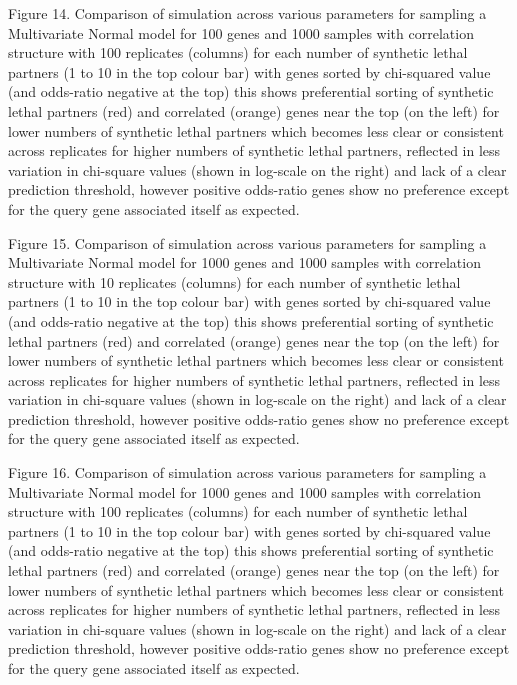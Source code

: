 Figure 14.  Comparison of simulation across various parameters for sampling a Multivariate Normal model for 100 genes and 1000 samples with correlation structure with 100 replicates (columns) for each number of \gls{synthetic lethal} partners (1 to 10 in the top colour bar) with genes sorted by chi-squared value (and odds-ratio negative at the top) this shows preferential sorting of \gls{synthetic lethal} partners (red) and correlated (orange) genes near the top (on the left) for lower numbers of \gls{synthetic lethal} partners which becomes less clear or consistent across replicates for higher numbers of \gls{synthetic lethal} partners, reflected in less variation in chi-square values (shown in log-scale on the right) and lack of a clear prediction threshold, however positive odds-ratio genes show no preference except for the query gene associated itself as expected.  
   
Figure 15.  Comparison of simulation across various parameters for sampling a Multivariate Normal model for 1000 genes and 1000 samples with correlation structure with 10 replicates (columns) for each number of \gls{synthetic lethal} partners (1 to 10 in the top colour bar) with genes sorted by chi-squared value (and odds-ratio negative at the top) this shows preferential sorting of \gls{synthetic lethal} partners (red) and correlated (orange) genes near the top (on the left) for lower numbers of \gls{synthetic lethal} partners which becomes less clear or consistent across replicates for higher numbers of \gls{synthetic lethal} partners, reflected in less variation in chi-square values (shown in log-scale on the right) and lack of a clear prediction threshold, however positive odds-ratio genes show no preference except for the query gene associated itself as expected.
    
Figure 16.  Comparison of simulation across various parameters for sampling a Multivariate Normal model for 1000 genes and 1000 samples with correlation structure with 100 replicates (columns) for each number of \gls{synthetic lethal} partners (1 to 10 in the top colour bar) with genes sorted by chi-squared value (and odds-ratio negative at the top) this shows preferential sorting of \gls{synthetic lethal} partners (red) and correlated (orange) genes near the top (on the left) for lower numbers of \gls{synthetic lethal} partners which becomes less clear or consistent across replicates for higher numbers of \gls{synthetic lethal} partners, reflected in less variation in chi-square values (shown in log-scale on the right) and lack of a clear prediction threshold, however positive odds-ratio genes show no preference except for the query gene associated itself as expected.
\fi